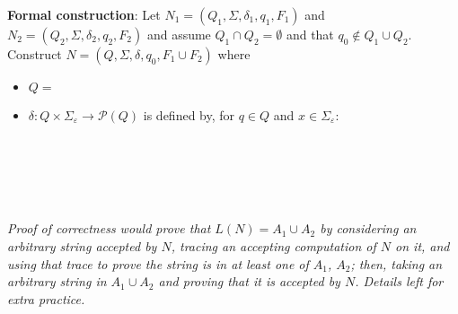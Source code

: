 \documentclass[12pt, oneside]{article}
\begin{document}
{\bf Formal construction}: Let 
$N_1 = (Q_1, \Sigma, \delta_1, q_1, F_1)$ and $N_2 = (Q_2, \Sigma, \delta_2,q_2, F_2)$
and assume $Q_1 \cap Q_2 = \emptyset$ and that $q_0 \notin Q_1 \cup Q_2$.
Construct $N = (Q, \Sigma, \delta, q_0, F_1 \cup F_2)$ where
\begin{itemize}
    \item $Q = $
    \item $\delta: Q \times \Sigma_\varepsilon \to \mathcal{P}(Q)$ is defined by, for $q \in Q$ and $x \in \Sigma_{\varepsilon}$:
        \[
            \phantom{\delta((q,x))=\begin{cases}  \delta_1 ((q,x)) &\qquad\text{if } q\in Q_1 \\ \delta_2 ((q,x)) &\qquad\text{if } q\in Q_2 \\ \{q1,q2\} &\qquad\text{if } q = q_0, x = \varepsilon \\ \emptyset\text{if } q= q_0, x \neq \varepsilon \end{cases}}
        \]
\end{itemize}


\vfill
{\it Proof of correctness would prove that $L(N) = A_1 \cup A_2$ by considering
an arbitrary string accepted by $N$, tracing an accepting computation of $N$ on it, and using 
that trace to prove the string is in at least one of $A_1$, $A_2$; then, taking an arbitrary 
string in $A_1 \cup A_2$ and proving that it is accepted by $N$. Details left for extra practice.}
 
\end{document}
